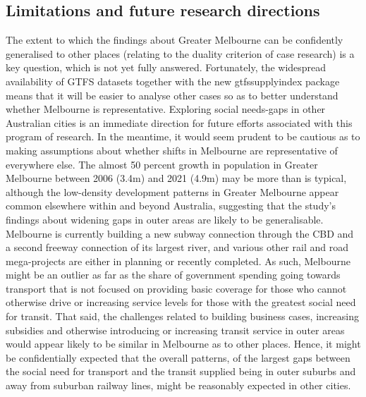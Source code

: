\documentclass[preprint, 3p,
authoryear]{elsarticle} %
\begin{document}
\subsection{Limitations and future research
directions}\label{limitations-and-future-research-directions}

The extent to which the findings about Greater Melbourne can be
confidently generalised to other places (relating to the duality
criterion of case research) is a key question, which is not yet fully
answered. Fortunately, the widespread availability of GTFS datasets
together with the new gtfssupplyindex package means that it will be
easier to analyse other cases so as to better understand whether
Melbourne is representative. Exploring social needs-gaps in other
Australian cities is an immediate direction for future efforts
associated with this program of research. In the meantime, it would seem
prudent to be cautious as to making assumptions about whether shifts in
Melbourne are representative of everywhere else. The almost 50 percent
growth in population in Greater Melbourne between 2006 (3.4m) and 2021
(4.9m) may be more than is typical, although the low-density development
patterns in Greater Melbourne appear common elsewhere within and beyond
Australia, suggesting that the study's findings about widening gaps in
outer areas are likely to be generalisable. Melbourne is currently
building a new subway connection through the CBD and a second freeway
connection of its largest river, and various other rail and road
mega-projects are either in planning or recently completed. As such,
Melbourne might be an outlier as far as the share of government spending
going towards transport that is not focused on providing basic coverage
for those who cannot otherwise drive or increasing service levels for
those with the greatest social need for transit. That said, the
challenges related to building business cases, increasing subsidies and
otherwise introducing or increasing transit service in outer areas would
appear likely to be similar in Melbourne as to other places. Hence, it
might be confidentially expected that the overall patterns, of the
largest gaps between the social need for transport and the transit
supplied being in outer suburbs and away from suburban railway lines,
might be reasonably expected in other cities.
\end{document}
